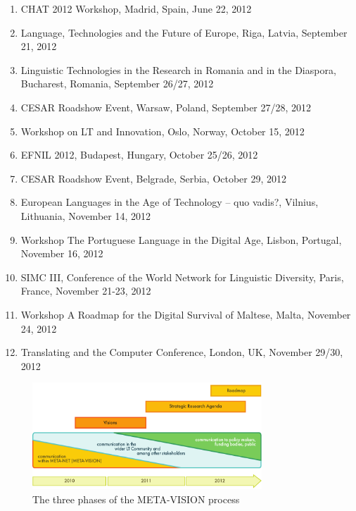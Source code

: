 \documentclass[10pt, plain]{../../metanetpaper}
\begin{document}
\begin{footnotesize}
\begin{enumerate}
\item CHAT 2012 Workshop, Madrid, Spain, June 22, 2012
\item Language, Technologies and the Future of Europe, Riga, Latvia, September 21, 2012
\item Linguistic Technologies in the Research in Romania and in the Diaspora, Bucharest, Romania, September 26/27, 2012
\item CESAR Roadshow Event, Warsaw, Poland, September 27/28, 2012
\item Workshop on LT and Innovation, Oslo, Norway, October 15, 2012
\item EFNIL 2012, Budapest, Hungary, October 25/26, 2012
\item CESAR Roadshow Event, Belgrade, Serbia, October 29, 2012
\item European Languages in the Age of Technology -- quo vadis?, Vilnius, Lithuania, November 14, 2012
\item Workshop The Portuguese Language in the Digital Age, Lisbon, Portugal, November 16, 2012
\item SIMC III, Conference of the World Network for Linguistic Diversity, Paris, France, November 21-23, 2012
\item Workshop A Roadmap for the Digital Survival of Maltese, Malta, November 24, 2012
\item Translating and the Computer Conference, London, UK, November 29/30, 2012
\end{enumerate}
\end{footnotesize}

\begin{figure}[htb]
  \center
  \includegraphics[width=0.77\textwidth]{../_media/Timeline}
  \caption{The three phases of the META-VISION process}
  \label{fig:sra-timeline}
\end{figure}
 
\end{document}
